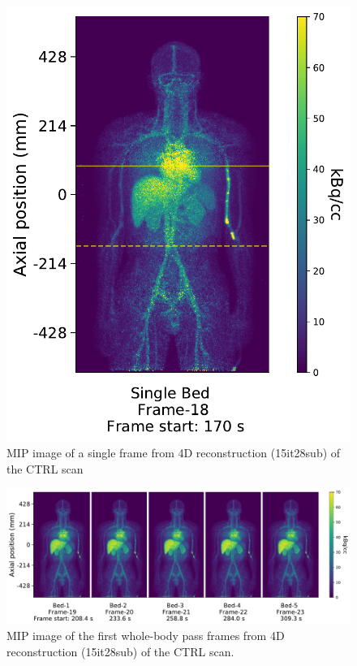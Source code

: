\begin{figure} [ht!]
\centering
\includegraphics[scale=0.52,angle=0]{3_Results/3_3_DWB_Reconstruction/figures/3_3_IsotoPK_CTRL_DSB_4D.pdf}
\caption{MIP image of a single frame from 4D reconstruction (15it28sub) of the CTRL scan}
\label{fig_3_3:IsotoPK_CTRL_DSB_4D}
\end{figure} 

\begin{figure} [ht!]
\centering
\includegraphics[scale=0.52,angle=0]{3_Results/3_3_DWB_Reconstruction/figures/3_3_IsotoPK_CTRL_DWB_4D.pdf}
\caption{MIP image of the first whole-body pass frames from 4D reconstruction (15it28sub) of the CTRL scan.}
\label{fig_3_3:IsotoPK_CTRL_DWB_4D}
\end{figure} 

